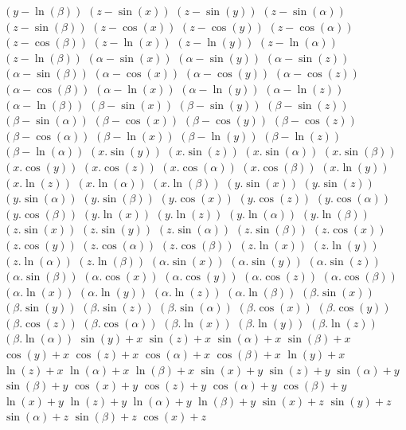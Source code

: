 $ (y - \ln(\beta)) $
$ (z - \sin(x)) $
$ (z - \sin(y)) $
$ (z - \sin(\alpha)) $
$ (z - \sin(\beta)) $
$ (z - \cos(x)) $
$ (z - \cos(y)) $
$ (z - \cos(\alpha)) $
$ (z - \cos(\beta)) $
$ (z - \ln(x)) $
$ (z - \ln(y)) $
$ (z - \ln(\alpha)) $
$ (z - \ln(\beta)) $
$ (\alpha - \sin(x)) $
$ (\alpha - \sin(y)) $
$ (\alpha - \sin(z)) $
$ (\alpha - \sin(\beta)) $
$ (\alpha - \cos(x)) $
$ (\alpha - \cos(y)) $
$ (\alpha - \cos(z)) $
$ (\alpha - \cos(\beta)) $
$ (\alpha - \ln(x)) $
$ (\alpha - \ln(y)) $
$ (\alpha - \ln(z)) $
$ (\alpha - \ln(\beta)) $
$ (\beta - \sin(x)) $
$ (\beta - \sin(y)) $
$ (\beta - \sin(z)) $
$ (\beta - \sin(\alpha)) $
$ (\beta - \cos(x)) $
$ (\beta - \cos(y)) $
$ (\beta - \cos(z)) $
$ (\beta - \cos(\alpha)) $
$ (\beta - \ln(x)) $
$ (\beta - \ln(y)) $
$ (\beta - \ln(z)) $
$ (\beta - \ln(\alpha)) $
$ (x . \sin(y)) $
$ (x . \sin(z)) $
$ (x . \sin(\alpha)) $
$ (x . \sin(\beta)) $
$ (x . \cos(y)) $
$ (x . \cos(z)) $
$ (x . \cos(\alpha)) $
$ (x . \cos(\beta)) $
$ (x . \ln(y)) $
$ (x . \ln(z)) $
$ (x . \ln(\alpha)) $
$ (x . \ln(\beta)) $
$ (y . \sin(x)) $
$ (y . \sin(z)) $
$ (y . \sin(\alpha)) $
$ (y . \sin(\beta)) $
$ (y . \cos(x)) $
$ (y . \cos(z)) $
$ (y . \cos(\alpha)) $
$ (y . \cos(\beta)) $
$ (y . \ln(x)) $
$ (y . \ln(z)) $
$ (y . \ln(\alpha)) $
$ (y . \ln(\beta)) $
$ (z . \sin(x)) $
$ (z . \sin(y)) $
$ (z . \sin(\alpha)) $
$ (z . \sin(\beta)) $
$ (z . \cos(x)) $
$ (z . \cos(y)) $
$ (z . \cos(\alpha)) $
$ (z . \cos(\beta)) $
$ (z . \ln(x)) $
$ (z . \ln(y)) $
$ (z . \ln(\alpha)) $
$ (z . \ln(\beta)) $
$ (\alpha . \sin(x)) $
$ (\alpha . \sin(y)) $
$ (\alpha . \sin(z)) $
$ (\alpha . \sin(\beta)) $
$ (\alpha . \cos(x)) $
$ (\alpha . \cos(y)) $
$ (\alpha . \cos(z)) $
$ (\alpha . \cos(\beta)) $
$ (\alpha . \ln(x)) $
$ (\alpha . \ln(y)) $
$ (\alpha . \ln(z)) $
$ (\alpha . \ln(\beta)) $
$ (\beta . \sin(x)) $
$ (\beta . \sin(y)) $
$ (\beta . \sin(z)) $
$ (\beta . \sin(\alpha)) $
$ (\beta . \cos(x)) $
$ (\beta . \cos(y)) $
$ (\beta . \cos(z)) $
$ (\beta . \cos(\alpha)) $
$ (\beta . \ln(x)) $
$ (\beta . \ln(y)) $
$ (\beta . \ln(z)) $
$ (\beta . \ln(\alpha)) $
$ \sin(y) + x $
$ \sin(z) + x $
$ \sin(\alpha) + x $
$ \sin(\beta) + x $
$ \cos(y) + x $
$ \cos(z) + x $
$ \cos(\alpha) + x $
$ \cos(\beta) + x $
$ \ln(y) + x $
$ \ln(z) + x $
$ \ln(\alpha) + x $
$ \ln(\beta) + x $
$ \sin(x) + y $
$ \sin(z) + y $
$ \sin(\alpha) + y $
$ \sin(\beta) + y $
$ \cos(x) + y $
$ \cos(z) + y $
$ \cos(\alpha) + y $
$ \cos(\beta) + y $
$ \ln(x) + y $
$ \ln(z) + y $
$ \ln(\alpha) + y $
$ \ln(\beta) + y $
$ \sin(x) + z $
$ \sin(y) + z $
$ \sin(\alpha) + z $
$ \sin(\beta) + z $
$ \cos(x) + z $
